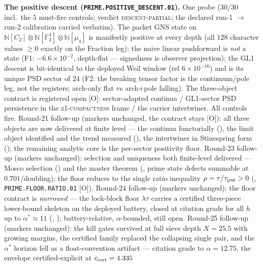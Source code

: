 \documentclass[11pt,a4paper]{article}
\theoremstyle{definition}
\begin{document}
\par\smallskip\noindent\textbf{The positive descent
(\texttt{PRIME.POSITIVE\_DESCENT.01}).}
One probe ($30/30$ incl.\ the $5$ must-fire controls; verdict
\textsc{descent-partial}; the declared run-1 $\to$ run-2
calibration carried verbatim).  The packet GNS state on
$\mathbb N[C_2]\otimes\mathbb N[\mathbb F_2^4]\otimes
\mathbb N[\mu_4]$ is manifestly positive at every depth (all $128$
character values $\ge0$ exactly on the Fraction leg); the naive
linear pushforward is \emph{not} a state (F1: $-6.6\times10^{-2}$,
depth-flat --- signedness is observer projection); the GL1 descent
is bit-identical to the deployed Weil window (rel
$6\times10^{-16}$) and is its unique PSD sector of $24$ (F2: the
breaking tensor factor is the continuum/pole leg, not the
registers; arch-only flat vs arch$+$pole falling).  The three-object
contract is registered open [O]: sector-adapted continua /
GL1-sector PSD persistence in the \textsc{z1-compactness} frame /
the carrier intertwiner.  All controls fire.  Round-21 follow-up
(markers unchanged, the contract stays [O]): all three objects are
now delivered at finite level --- the continua functorially
(), the limit object identified
and the trend measured (), the
intertwiner in Stinespring form
(); the remaining analytic
core is the per-sector positivity floor.  Round-23 follow-up
(markers unchanged): selection and uniqueness both finite-level
delivered --- Mosco selection
() and the master theorem
(, prime state defects
summable at $0.701$/doubling); the floor reduces to the single
ratio inequality $\rho=\tau/\tau_{\rm pnt}>0$
(,
\texttt{PRIME.FLOOR.RATIO.01} [O]).  Round-24 follow-up (markers
unchanged): the floor contract is \emph{narrowed} --- the
lock-block floor $\lambda\tau$ carries a certified three-piece
lower-bound skeleton on the deployed battery, closed at citation
grade for all $h$ up to $\alpha^*\approx11$
(,
); battery-relative,
$\alpha$-bounded, still open.  Round-25 follow-up (markers
unchanged): the kill gates survived at full sieve depth
$X = 25.5$ with growing margins, the certified family replaced
the collapsing single pair, and the $\alpha^*$ horizon fell as a
float-convention artifact --- citation grade to $\alpha = 12.75$,
the envelope certified-explicit at $c_{\rm cert} = 4.335$
\end{document}
